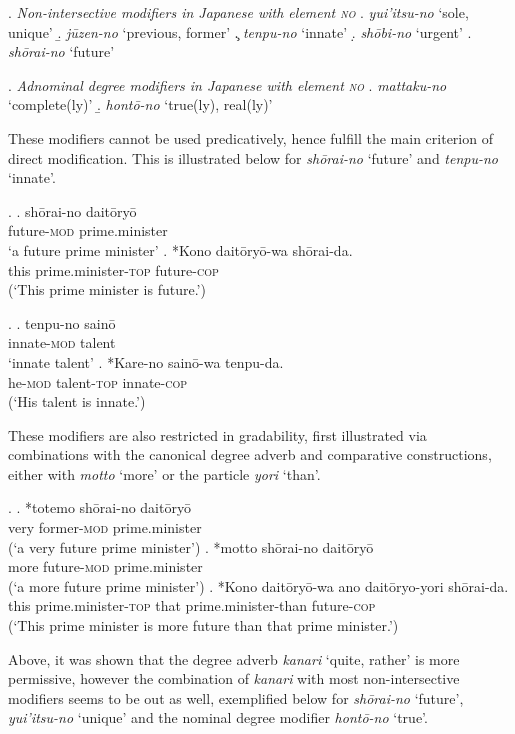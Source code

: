 \ex. \emph{Non-intersective modifiers in Japanese with element \textsc{no}}
\a. \textit{yui'itsu-no} `sole, unique'
\b. \textit{jūzen-no} `previous, former’
\c. \textit{tenpu-no} `innate’
\d. \textit{shōbi-no} `urgent’
\e. \textit{shōrai-no} `future'

\ex. \emph{Adnominal degree modifiers in Japanese with element \textsc{no}}
\a. \textit{mattaku-no} `complete(ly)'
\b. \textit{hontō-no} `true(ly), real(ly)'

These modifiers cannot be used predicatively, hence fulfill the main criterion of direct modification. This is illustrated below for \textit{shōrai-no} `future’ and \textit{tenpu-no} `innate’.

\largerpage
\ex. \ag. shōrai-no daitōryō\\
future-\textsc{mod} prime.minister\\
`a future prime minister’
\bg. *Kono daitōryō-wa shōrai-da.\\
this prime.minister-\textsc{top} future-\textsc{cop}\\
(`This prime minister is future.’)

\ex. \ag. tenpu-no sainō\\
innate-\textsc{mod} talent\\
`innate talent’
\bg. *Kare-no sainō-wa tenpu-da.\\
he-\textsc{mod} talent-\textsc{top} innate-\textsc{cop}\\
(`His talent is innate.’)

These modifiers are also restricted in gradability, first illustrated via combinations with the canonical degree adverb and comparative constructions, either with \textit{motto} `more’ or the particle \textit{yori} `than’.

\ex. \ag. *totemo shōrai-no daitōryō\\
very former-\textsc{mod} prime.minister\\
(`a very future prime minister’)
\bg. *motto shōrai-no daitōryō\\
more future-\textsc{mod} prime.minister\\
(`a more future prime minister’)
\cg. *Kono daitōryō-wa ano daitōryo-yori shōrai-da.\\
this prime.minister-\textsc{top} that prime.minister-than future-\textsc{cop}\\
(`This prime minister is more future than that prime minister.’)

Above, it was shown that the degree adverb \textit{kanari} `quite, rather' is more permissive, however the combination of \textit{kanari} with most non-intersective modifiers seems to be out as well, exemplified below for \textit{shōrai-no} `future’, \textit{yui’itsu-no} `unique’ and the nominal degree modifier \textit{hontō-no} `true’.

